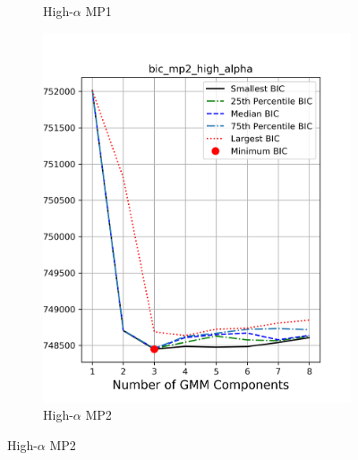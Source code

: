 \documentclass[a4paper,12pt]{article}
\begin{document}
\begin{figure}[htbp]
\begin{subfigure}[t]{0.24\textwidth}
        \caption{High-$\alpha$ MP1}
    \end{subfigure}
    \begin{subfigure}[t]{0.24\textwidth}
        \includegraphics[width=\textwidth]{../figures/bic_mp2_high_alpha.png}
        \caption{High-$\alpha$ MP2}
    \end{subfigure}

    \vspace{0.5em}


\end{figure}
\end{document}
